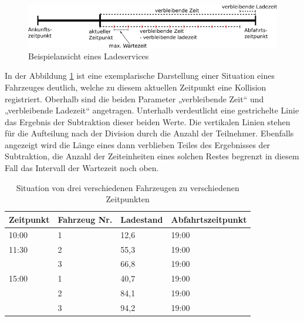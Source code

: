 \begin{figure}[htb]
	\includegraphics[width = \linewidth]{img/SA_waiting_Graph3.png}
	\caption{Beispielansicht eines Ladeservices}
	\label{SAWait:Graph}
\end{figure}

In der Abbildung \ref{SAWait:Graph} ist eine exemplarische Darstellung einer Situation eines Fahrzeuges deutlich, welche zu diesem aktuellen  Zeitpunkt eine Kollision registriert. Oberhalb sind die beiden Parameter „verbleibende Zeit“ und „verbleibende Ladezeit“ angetragen. Unterhalb verdeutlicht eine gestrichelte Linie das Ergebnis der Subtraktion dieser beiden Werte. Die vertikalen Linien stehen für die Aufteilung nach der Division durch die Anzahl der Teilnehmer. Ebenfalls angezeigt wird die Länge eines dann verblieben Teiles des Ergebnisses der Subtraktion, die Anzahl der Zeiteinheiten eines solchen Restes begrenzt in diesem Fall das Intervall der Wartezeit noch oben.\\
\begin{table}[htb]
\centering
\begin{tabular}{|l|l|l|l|}
\hline
Zeitpunkt & Fahrzeug Nr. & Ladestand & Abfahrtszeitpunkt \\ \hline \hline
10:00     & 1            & 12,6      & 19:00             \\ \hline
11:30     & 2            & 55,3      & 19:00             \\ \hline
          & 3            & 66,8      & 19:00             \\ \hline
15:00     & 1            & 40,7      & 19:00             \\ \hline
          & 2            & 84,1      & 19:00             \\ \hline
          & 3            & 94,2      & 19:00             \\ \hline
\end{tabular}
\caption{Situation von drei verschiedenen Fahrzeugen zu verschiedenen Zeitpunkten}
\label{tab:example2}
\end{table}

